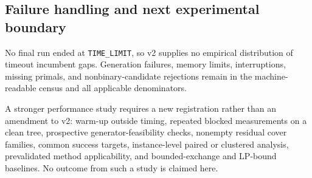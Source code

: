 \subsection{Failure handling and next experimental boundary}

No final run ended at \texttt{TIME\_LIMIT}, so v2 supplies no empirical
distribution of timeout incumbent gaps. Generation failures, memory limits,
interruptions, missing primals, and nonbinary-candidate rejections remain in the
machine-readable census and all applicable denominators.

A stronger performance study requires a new registration rather than an
amendment to v2: warm-up outside timing, repeated blocked measurements on a
clean tree, prospective generator-feasibility checks, nonempty residual cover
families, common success targets, instance-level paired or clustered analysis,
prevalidated method applicability, and bounded-exchange and LP-bound baselines.
No outcome from such a study is claimed here.

